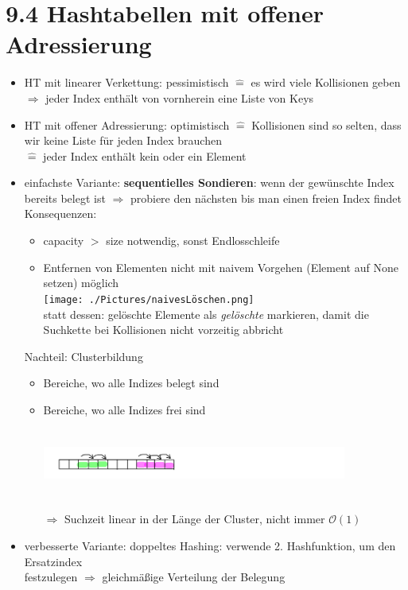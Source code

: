 \documentclass[11pt, fleqn]{scrreprt}
\newcommand{\bigO}[0]{\mathcal{O}}
\begin{document}
\section*{9.4 Hashtabellen mit offener Adressierung}
\begin{itemize}
    \item HT mit linearer Verkettung: pessimistisch $\widehat{=}$ es wird viele Kollisionen geben\\ \hspace*{3cm}$\Rightarrow$ jeder Index enthält von vornherein eine Liste von Keys
    \item HT mit offener Adressierung: optimistisch $\widehat{=}$ Kollisionen sind so selten, dass wir keine Liste für jeden Index brauchen\\ \hspace*{3cm}$\widehat{=}$ jeder Index enthält kein oder ein Element
    \item einfachste Variante: \textbf{sequentielles Sondieren}: wenn der gewünschte Index bereits belegt ist $\Rightarrow$ probiere den nächsten bis man einen freien Index findet \\
    Konsequenzen:
    \begin{itemize}
        \item capacity $>$ size notwendig, sonst Endlosschleife
        \item Entfernen von Elementen nicht mit naivem Vorgehen (Element auf None setzen) möglich\\
        \texttt{[image: ./Pictures/naivesLöschen.png]}\\
        statt dessen: gelöschte Elemente als \emph{gelöschte} markieren, damit die Suchkette bei Kollisionen nicht vorzeitig abbricht
    \end{itemize}
    Nachteil: Clusterbildung
    \begin{itemize}
        \item Bereiche, wo alle Indizes belegt sind
        \item Bereiche, wo alle Indizes frei sind\\
        \includegraphics[width=10cm,height=3cm,keepaspectratio]{./Pictures/buntesArray.png}\\
        $\Rightarrow$ Suchzeit linear in der Länge der Cluster, nicht immer $\bigO{}(1)$
    \end{itemize}
    \item verbesserte Variante: doppeltes Hashing: verwende 2. Hashfunktion, um den Ersatzindex\\ \hspace*{5mm}festzulegen $\Rightarrow$ gleichmäßige Verteilung der Belegung
\end{itemize}
\end{document}
